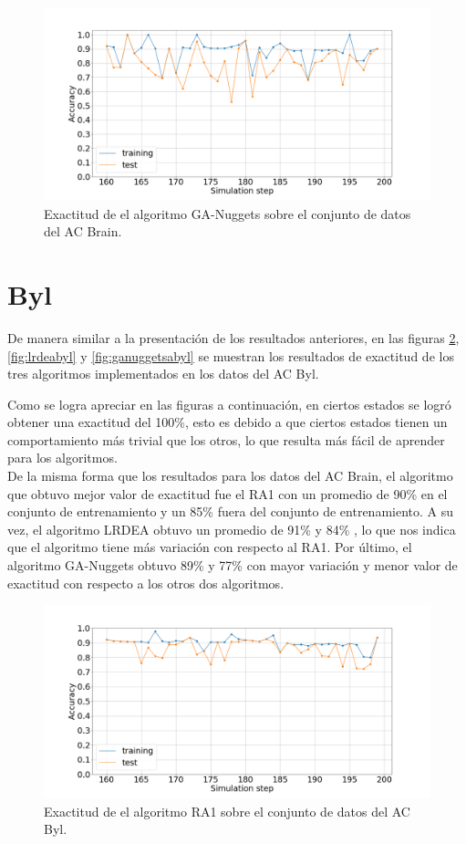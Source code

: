 	\begin{figure}[H]
		\centering
		\includegraphics[width=\linewidth]{fig/GA-nuggets_2}
		\caption{Exactitud de el algoritmo GA-Nuggets sobre el conjunto de datos del AC Brain.}
		\label{fig:ganuggetsabrain}
	\end{figure}

\section{Byl}
De manera similar a la presentación de los resultados anteriores, en las figuras \ref{fig:ra1byl}, \ref{fig:lrdeabyl} y \ref{fig:ganuggetsabyl} se muestran los resultados de exactitud de los tres algoritmos implementados en los datos del AC Byl.

Como se logra apreciar en las figuras a continuación, en ciertos estados se logró obtener una exactitud del 100\%, esto es debido a que ciertos estados tienen un comportamiento más trivial que los otros, lo que resulta más fácil de aprender para los algoritmos.
\\
De la misma forma que los resultados para los datos del AC Brain, el algoritmo que obtuvo mejor valor de exactitud fue el RA1 con un promedio de 90\% en el conjunto de entrenamiento y un 85\% fuera del conjunto de entrenamiento. A su vez, el algoritmo LRDEA obtuvo un promedio de 91\% y 84\% , lo que nos indica que el algoritmo tiene más variación con respecto al RA1. Por último, el algoritmo GA-Nuggets obtuvo 89\% y 77\% con mayor variación y menor valor de exactitud con respecto a los otros dos algoritmos.
\begin{figure}[H]
	\centering
	\includegraphics[width=\linewidth]{fig/ra1_3}
	\caption{Exactitud de el algoritmo RA1 sobre el conjunto de datos del AC Byl.}
	\label{fig:ra1byl}
\end{figure}

